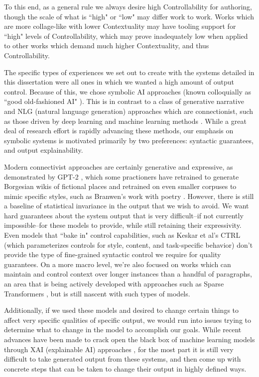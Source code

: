 To this end, as a general rule we always desire high Controllability for authoring, though the scale of what is ``high" or ``low" may differ work to work. Works which are more collage-like with lower Contextuality may have tooling support for ``high" levels of Controllability, which may prove inadequately low when applied to other works which demand much higher Contextuality, and thus Controllability.

The specific types of experiences we set out to create with the systems detailed in this dissertation were all ones in which we wanted a high amount of output control. Because of this, we chose symbolic AI approaches (known colloquially as ``good old-fashioned AI" \cite{haugeland1985artificial}). This is in contrast to a class of generative narrative and NLG (natural language generation) approaches which are connectionist, such as those driven by deep learning and machine learning methods \cite{gofai_vs_connectionist_1989}. While a great deal of research effort is rapidly advancing these methods, our emphasis on symbolic systems is motivated primarily by two preferences: syntactic guarantees, and output explainability.

Modern connectivist approaches are certainly generative and expressive, as demonstrated by GPT-2 \cite{radford2019language}, which some practioners have retrained to generate Borgesian wikis of fictional places \cite{book_of_endless_history} and retrained on even smaller corpuses to mimic specific styles, such as Branwen's work with poetry \cite{branwen_2019}. However, there is still a baseline of statistical invariance in the output that we wish to avoid. We want hard guarantees about the system output that is very difficult--if not currently impossible--for these models to provide, while still retaining their expressivity. Even models that ``bake in" control capabilities, such as Keskar et al's CTRL \cite{Keskar2019CTRLAC} (which parameterizes controls for style, content, and task-specific behavior) don't provide the type of fine-grained syntactic control we require for quality guarantees. On a more macro level, we're also focused on works which can maintain and control context over longer instances than a handful of paragraphs, an area that is being actively developed with approaches such as Sparse Transformers \cite{child2019sparsetransformer}, but is still nascent with such types of models.

Additionally, if we used these models and desired to change certain things to affect very specific qualities of specific output, we would run into issues trying to determine what to change in the model to accomplish our goals. While recent advances have been made to crack open the black box of machine learning models through XAI (explainable AI) approaches \cite{gunning2017explainable}, for the most part it is still very difficult to take generated output from these systems, and then come up with concrete steps that can be taken to change their output in highly defined ways.

